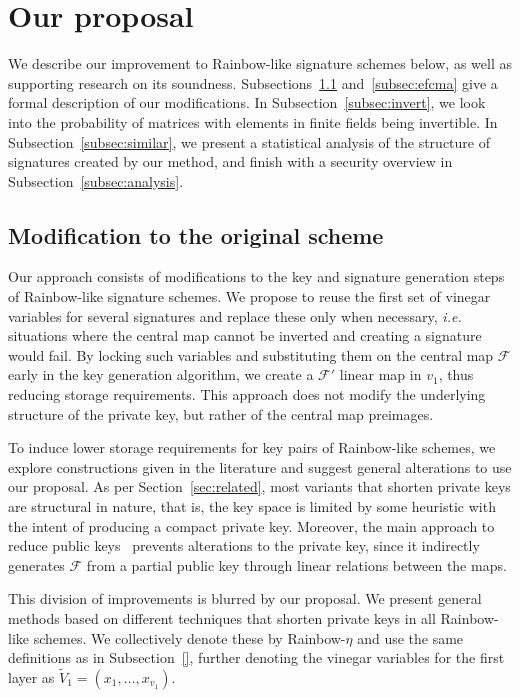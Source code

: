 \documentclass[draft, 12pt, a4paper, oneside]{memoir}
\theoremstyle{definition}
\theoremstyle{remark}
\begin{document}
\section{Our proposal}\label{sec:proposal}

We describe our improvement to Rainbow-like signature schemes below, as
well as supporting research on its soundness. Subsections~\ref{subsec:scheme}
and~\ref{subsec:efcma} give a formal description of our modifications. In
Subsection~\ref{subsec:invert}, we look into the probability of matrices with
elements in finite fields being invertible. In Subsection~\ref{subsec:similar},
we present a statistical analysis of the structure of signatures created by our
method, and finish with a security overview in
Subsection~\ref{subsec:analysis}.

\subsection{Modification to the original scheme}\label{subsec:scheme}

Our approach consists of modifications to the key and signature generation
steps of Rainbow-like signature schemes. We propose to reuse the first set of
vinegar variables for several signatures and replace these only when necessary,
\emph{i.e.} situations where the central map cannot be inverted and creating a
signature would fail. By locking such variables and substituting them on the
central map $\mathcal{F}$ early in the key generation algorithm, we create a
$\mathcal{F}'$ linear map in $v_{1}$, thus reducing storage requirements. This
approach does not modify the underlying structure of the private key, but
rather of the central map preimages.

To induce lower storage requirements for key pairs of Rainbow-like schemes, we
explore constructions given in the literature and suggest general alterations
to use our proposal. As per Section~\ref{sec:related}, most variants that
shorten private keys are structural in nature, that is, the key space is
limited by some heuristic with the intent of producing a compact private key.
Moreover, the main approach to reduce public keys~\cite{Petzoldt:201307}
prevents alterations to the private key,
since it indirectly generates $\mathcal{F}$ from a partial public key through
linear relations between the maps.

This division of improvements is blurred by our proposal. We present general
methods based on different techniques that shorten private keys in all
Rainbow-like schemes. We collectively denote these by Rainbow-$\eta$ and use
the same definitions as in Subsection~\ref{}, further denoting
the vinegar variables for the first layer as
$\widetilde{V}_{1} = (x_{1}, \dots, x_{v_{1}})$.
\end{document}
